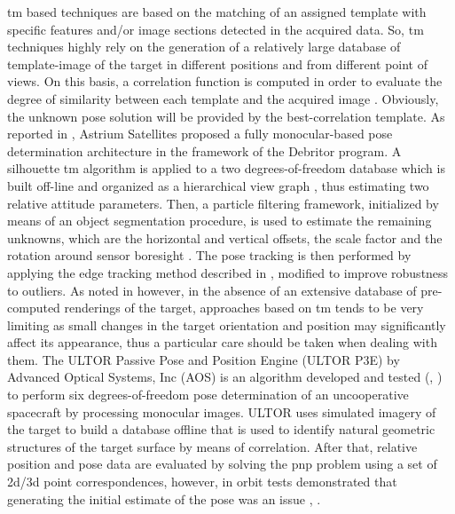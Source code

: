 \acrshort{tm} based techniques are based on the matching of an assigned template with specific features and/or image sections detected in the acquired data. So, \acrshort{tm} techniques highly rely on the generation of a relatively large database of template-image of the target in different positions and from different point of views. On this basis, a correlation function is computed in order to evaluate the degree of similarity between each template and the acquired image \cite{Opromolla2017}. Obviously, the unknown pose solution will be provided by the best-correlation template. As reported in \cite{Opromolla2017}, Astrium Satellites proposed a fully monocular-based pose determination architecture in the framework of the Debritor program. A silhouette \acrshort{tm} algorithm is applied to a two degrees-of-freedom database which is built off-line and organized as a hierarchical view graph \cite{Reinbacher2010}, thus estimating two relative attitude parameters. Then, a particle filtering framework, initialized by means of an object segmentation procedure, is used to estimate the remaining unknowns, which are the horizontal and vertical offsets, the scale factor and the rotation around sensor boresight \cite{petit2012}. The pose tracking is then performed by applying the edge tracking method described in \cite{Comport2006}, modified to improve robustness to outliers. As noted in \cite{2019phdSharma} however, in the absence of an extensive database of pre-computed renderings of the target, approaches based on \acrshort{tm} tends to be very limiting as small changes in the target orientation and position may significantly affect its appearance, thus a particular care should be taken when dealing with them.
The ULTOR Passive Pose and Position Engine (ULTOR P3E) by Advanced Optical Systems, Inc (AOS) is an algorithm developed and tested (\cite{Naasz2009}, \cite{Naasz2010}) to perform six degrees-of-freedom pose determination of an uncooperative spacecraft by processing monocular images. ULTOR uses simulated imagery of the target to build a
database offline that is used to identify natural geometric structures of the target surface by means of correlation. After that, relative position and pose data are evaluated by solving the \acrshort{pnp} problem using a set of \acrshort{2d}/\acrshort{3d} point correspondences, however, in orbit tests demonstrated that generating the initial estimate of the pose was an issue \cite{D2014}, \cite{Naasz2010}.

